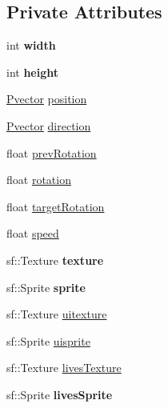 \subsection*{Private Attributes}
\begin{DoxyCompactItemize}
\item 
int {\bfseries width}\hypertarget{class_player_ab112e078741802afd6c095ddea241b2f}{}\label{class_player_ab112e078741802afd6c095ddea241b2f}

\item 
int {\bfseries height}\hypertarget{class_player_a682cd9664c9ea2e27c0f269d762bfa28}{}\label{class_player_a682cd9664c9ea2e27c0f269d762bfa28}

\item 
\hyperlink{class_pvector}{Pvector} \hyperlink{class_player_acf13aec63f3c028acbbf431a3c2aa9f5}{position}
\item 
\hyperlink{class_pvector}{Pvector} \hyperlink{class_player_a98523d6528d6b4a04f910335599dfd0f}{direction}
\item 
float \hyperlink{class_player_a458923e42b021f2a7747e6d94912ad2a}{prev\+Rotation}
\item 
float \hyperlink{class_player_ad94d3e5ab67795f8f848a7fd565f376f}{rotation}
\item 
float \hyperlink{class_player_a6185b0bd1fac283fb37a3f29e36d29f5}{target\+Rotation}
\item 
float \hyperlink{class_player_a770942101eff683b030edde9f730d537}{speed}
\item 
sf\+::\+Texture {\bfseries texture}\hypertarget{class_player_a9c6c14b89a6f99031a0d677828f1fa1a}{}\label{class_player_a9c6c14b89a6f99031a0d677828f1fa1a}

\item 
sf\+::\+Sprite {\bfseries sprite}\hypertarget{class_player_a19bc8731e5e84613a2ae7c4b5134dfab}{}\label{class_player_a19bc8731e5e84613a2ae7c4b5134dfab}

\item 
sf\+::\+Texture \hyperlink{class_player_a5958cdcfe9ad932e79fa1ec92c99fcfc}{uitexture}
\item 
sf\+::\+Sprite \hyperlink{class_player_a77d9d9c028b74c1d83744762f655352d}{uisprite}
\item 
sf\+::\+Texture \hyperlink{class_player_a91cb40005f212595ce807fedf874fde6}{lives\+Texture}
\item 
sf\+::\+Sprite {\bfseries lives\+Sprite}\hypertarget{class_player_a8af7d98210c40a0f16015daeec697862}{}\label{class_player_a8af7d98210c40a0f16015daeec697862}


\end{DoxyCompactItemize}
